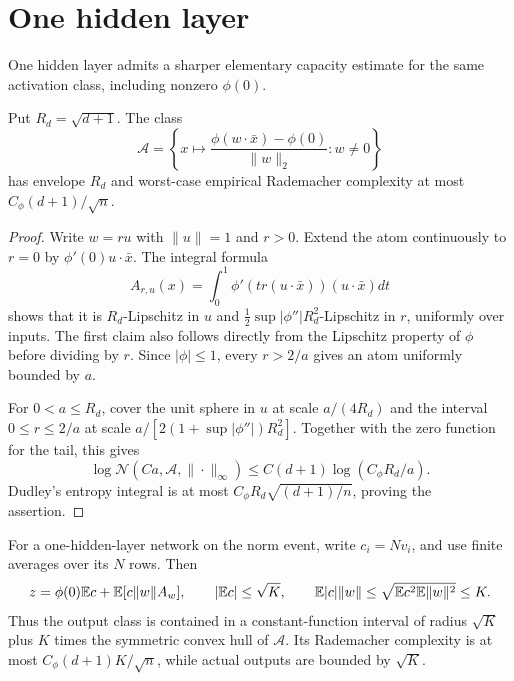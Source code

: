 \section{One hidden layer}
\label{sec:one-hidden}
One hidden layer admits a sharper elementary capacity estimate for the same activation class, including nonzero $\phi(0)$.

\begin{lemma}
\label{lem:normalized-atoms}
Put $R_d=\sqrt{d+1}$. The class
\[
 \mathcal A=\left\{x\mapsto
   \frac{\phi(w\cdot\bar x)-\phi(0)}{\|w\|_2}:w\ne0\right\}
\]
has envelope $R_d$ and worst-case empirical Rademacher complexity at most $C_\phi(d+1)/\sqrt n$.
\end{lemma}
\begin{proof}
Write $w=ru$ with $\|u\|=1$ and $r>0$. Extend the atom continuously to $r=0$ by $\phi'(0)u\cdot\bar x$. The integral formula
\[
 A_{r,u}(x)=\int_0^1\phi'(tr(u\cdot\bar x))(u\cdot\bar x)dt
\]
shows that it is $R_d$-Lipschitz in $u$ and $\tfrac12\sup|\phi''|R_d^2$-Lipschitz in $r$, uniformly over inputs. The first claim also follows directly from the Lipschitz property of $\phi$ before dividing by $r$. Since $|\phi|\le1$, every $r>2/a$ gives an atom uniformly bounded by $a$.

For $0<a\le R_d$, cover the unit sphere in $u$ at scale $a/(4R_d)$ and the interval $0\le r\le2/a$ at scale $a/[2(1+\sup|\phi''|)R_d^2]$. Together with the zero function for the tail, this gives
\[
 \log\mathcal N(Ca,\mathcal A,\|\cdot\|_\infty)
 \le C(d+1)\log(C_\phi R_d/a).
\]
Dudley's entropy integral is at most $C_\phi R_d\sqrt{(d+1)/n}$, proving the assertion.
\end{proof}

For a one-hidden-layer network on the norm event, write $c_i=Nv_i$, and use finite averages over its $N$ rows. Then
\[
 z=\phi(0)\mathbb E c+\mathbb E[c\|w\|A_w],\qquad
 |\mathbb E c|\le\sqrt K,\qquad
 \mathbb E|c|\|w\|\le\sqrt{\mathbb E c^2\mathbb E\|w\|^2}\le K.
\]
Thus the output class is contained in a constant-function interval of radius $\sqrt K$ plus $K$ times the symmetric convex hull of $\mathcal A$. Its Rademacher complexity is at most $C_\phi(d+1)K/\sqrt n$, while actual outputs are bounded by $\sqrt K$.

